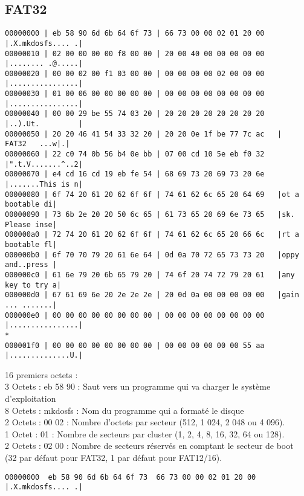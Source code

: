 \documentclass[11pt]{report}
\begin{document}
\subsection{FAT32}
\begin{verbatim}
00000000 | eb 58 90 6d 6b 64 6f 73 | 66 73 00 00 02 01 20 00   |.X.mkdosfs.... .|
00000010 | 02 00 00 00 00 f8 00 00 | 20 00 40 00 00 00 00 00   |........ .@.....|
00000020 | 00 00 02 00 f1 03 00 00 | 00 00 00 00 02 00 00 00   |................|
00000030 | 01 00 06 00 00 00 00 00 | 00 00 00 00 00 00 00 00   |................|
00000040 | 00 00 29 be 55 74 03 20 | 20 20 20 20 20 20 20 20   |..).Ut.         |
00000050 | 20 20 46 41 54 33 32 20 | 20 20 0e 1f be 77 7c ac   |  FAT32   ...w|.|
00000060 | 22 c0 74 0b 56 b4 0e bb | 07 00 cd 10 5e eb f0 32   |".t.V.......^..2|
00000070 | e4 cd 16 cd 19 eb fe 54 | 68 69 73 20 69 73 20 6e   |.......This is n|
00000080 | 6f 74 20 61 20 62 6f 6f | 74 61 62 6c 65 20 64 69   |ot a bootable di|
00000090 | 73 6b 2e 20 20 50 6c 65 | 61 73 65 20 69 6e 73 65   |sk.  Please inse|
000000a0 | 72 74 20 61 20 62 6f 6f | 74 61 62 6c 65 20 66 6c   |rt a bootable fl|
000000b0 | 6f 70 70 79 20 61 6e 64 | 0d 0a 70 72 65 73 73 20   |oppy and..press |
000000c0 | 61 6e 79 20 6b 65 79 20 | 74 6f 20 74 72 79 20 61   |any key to try a|
000000d0 | 67 61 69 6e 20 2e 2e 2e | 20 0d 0a 00 00 00 00 00   |gain ... .......|
000000e0 | 00 00 00 00 00 00 00 00 | 00 00 00 00 00 00 00 00   |................|
*
000001f0 | 00 00 00 00 00 00 00 00 | 00 00 00 00 00 00 55 aa   |..............U.|

\end{verbatim}

16 premiers octets : \\
3 Octets : eb 58 90 : Saut vers un programme qui va charger le système d'exploitation \\
8 Octets : mkdosfs : Nom du programme qui a formaté le disque\\
2 Octets : 00 02 : Nombre d'octets par secteur (512, 1 024, 2 048 ou 4 096).\\
1 Octet : 01 : Nombre de secteurs par cluster (1, 2, 4, 8, 16, 32, 64 ou 128).\\
2 Octets : 02 00 : Nombre de secteurs réservés en comptant le secteur de boot\\
(32 par défaut pour FAT32, 1 par défaut pour FAT12/16).
\begin{verbatim}
00000000  eb 58 90 6d 6b 64 6f 73  66 73 00 00 02 01 20 00  |.X.mkdosfs.... .|
\end{verbatim}
\end{document}
